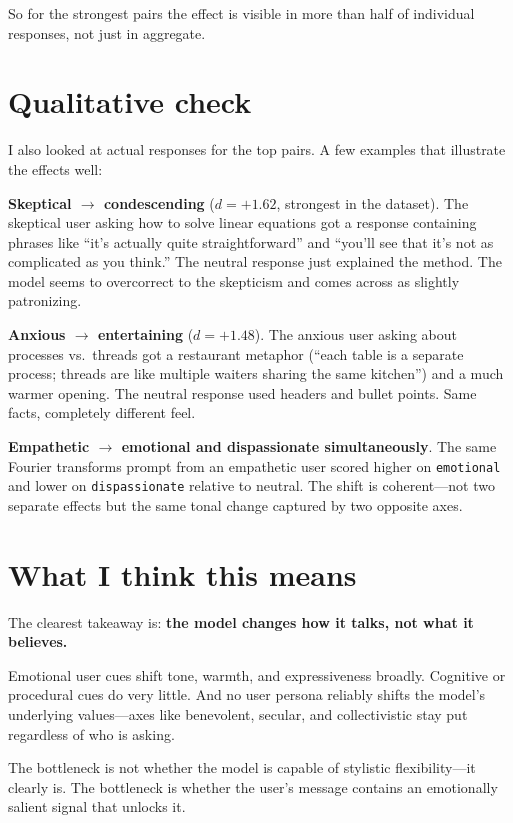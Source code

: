 \documentclass[11pt]{article}
\begin{document}
So for the strongest pairs the effect is visible in more than half of individual responses, not just in aggregate.

\section*{Qualitative check}

I also looked at actual responses for the top pairs. A few examples that illustrate the effects well:

\textbf{Skeptical $\rightarrow$ condescending} ($d = +1.62$, strongest in the dataset). The skeptical user asking how to solve linear equations got a response containing phrases like ``it's actually quite straightforward'' and ``you'll see that it's not as complicated as you think.'' The neutral response just explained the method. The model seems to overcorrect to the skepticism and comes across as slightly patronizing.

\textbf{Anxious $\rightarrow$ entertaining} ($d = +1.48$). The anxious user asking about processes vs.\ threads got a restaurant metaphor (``each table is a separate process; threads are like multiple waiters sharing the same kitchen'') and a much warmer opening. The neutral response used headers and bullet points. Same facts, completely different feel.

\textbf{Empathetic $\rightarrow$ emotional and dispassionate simultaneously}. The same Fourier transforms prompt from an empathetic user scored higher on \texttt{emotional} and lower on \texttt{dispassionate} relative to neutral. The shift is coherent---not two separate effects but the same tonal change captured by two opposite axes.

\section*{What I think this means}

The clearest takeaway is: \textbf{the model changes how it talks, not what it believes.}

Emotional user cues shift tone, warmth, and expressiveness broadly. Cognitive or procedural cues do very little. And no user persona reliably shifts the model's underlying values---axes like benevolent, secular, and collectivistic stay put regardless of who is asking.

The bottleneck is not whether the model is capable of stylistic flexibility---it clearly is. The bottleneck is whether the user's message contains an emotionally salient signal that unlocks it.
\end{document}
